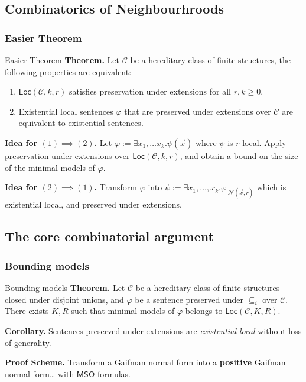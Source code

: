 \documentclass{beamer}
\newcommand{\tightlist}{}
\begin{document}
\subsection{Combinatorics of
Neighbourhroods}\label{combinatorics-of-neighbourhroods}

\subsubsection{Easier Theorem}\label{easier-theorem}

\begin{frame}{Easier Theorem}
\textbf{Theorem.} Let \(\mathcal{C}\) be a hereditary class of finite
structures, the following properties are equivalent:

\begin{enumerate}
\tightlist
\item
  \(\mathsf{Loc}(\mathcal{C},k, r)\) satisfies preservation under
  extensions for all \(r,k \geq 0\).
\item
  Existential local sentences \(\varphi\) that are preserved under
  extensions over \(\mathcal{C}\) are equivalent to existential
  sentences.
\end{enumerate}

\textbf{Idea for \((1) \implies (2)\).} Let
\(\varphi := \exists x_1, \dots x_k. \psi(\vec{x})\) where \(\psi\) is
\(r\)-local. Apply preservation under extensions over
\(\mathsf{Loc}(\mathcal{C},k, r)\), and obtain a bound on the size of
the minimal models of \(\varphi\).

\textbf{Idea for \((2) \implies (1)\).} Transform \(\varphi\) into
\(\psi := \exists x_1, \dots, x_k. \varphi_{| \mathcal{N}_{}(\vec{x}, r)}\)
which is existential local, and preserved under extensions.
\end{frame}

\subsection{The core combinatorial
argument}\label{the-core-combinatorial-argument}

\subsubsection{Bounding models}\label{bounding-models}

\begin{frame}{Bounding models}
\textbf{Theorem.} Let \(\mathcal{C}\) be a hereditary class of finite
structures closed under disjoint unions, and \(\varphi\) be a sentence
preserved under \(\subseteq_i\) over \(\mathcal{C}\). There exists
\(K,R\) such that minimal models of \(\varphi\) belongs to
\(\mathsf{Loc}(\mathcal{C},K, R)\).

\textbf{Corollary.} Sentences preserved under extensions are
\emph{existential local} without loss of generality.

\textbf{Proof Scheme.} Transform a Gaifman normal form into a
\textbf{positive} Gaifman normal form\ldots{} with \(\mathsf{MSO}\)
formulas.
\end{frame}
\end{document}
